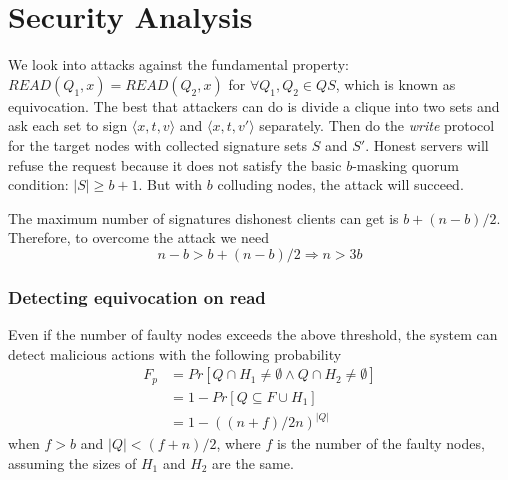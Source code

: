 \section{Security Analysis}
We look into attacks against the fundamental property:
$READ(Q_1,x) = READ(Q_2,x)$ for $\forall Q_1, Q_2 \in QS$, which is
known as equivocation.  The best that attackers can do is divide a
clique into two sets and ask each set to sign $\langle x,t,v \rangle$
and $\langle x,t,v' \rangle$ separately. Then do the {\em write}
protocol for the target nodes with collected signature sets $S$ and
$S'$. Honest servers will refuse the request because it does not
satisfy the basic $b$-masking quorum condition: $|S| \geq b+1$. But
with $b$ colluding nodes, the attack will succeed.

\newcommand{\slice}[4]{
  \pgfmathparse{0.5*#1+0.5*#2}
  \let\midangle\pgfmathresult

  \draw[thick,fill=black!10] (0,0) -- (#1:1) arc (#1:#2:1) -- cycle;

  \node[label=\midangle:#4] at (\midangle:1) {};

  \pgfmathparse{min((#2-#1-10)/110*(-0.3),0)}
  \let\temp\pgfmathresult
  \pgfmathparse{max(\temp,-0.5) + 0.8}
  \let\innerpos\pgfmathresult
  \node at (\midangle:\innerpos) {#3};
}


The maximum number of signatures dishonest clients can get is
$b+(n-b)/2$. Therefore, to overcome the attack we need
\[ n-b > b+(n-b)/2 \Rightarrow n > 3b \]

\subsubsection*{Detecting equivocation on read}
Even if the number of faulty nodes exceeds the above threshold, the
system can detect malicious actions with the following probability
\begin{align*}
  F_p &= Pr[Q \cap H_1 \neq \emptyset \wedge Q \cap H_2 \neq
        \emptyset] \\
      & = 1 - Pr[Q \subseteq F \cup H_1] \\
      & = 1 - ((n + f) / 2n)^{|Q|}
\end{align*}
when $f > b$ and $|Q| < (f + n)/2$, where $f$ is the number of the
faulty nodes, assuming the sizes of $H_1$ and $H_2$ are the same.

